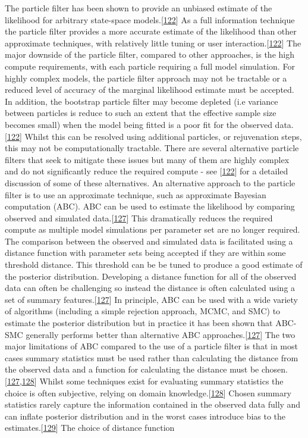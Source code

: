 \documentclass[11pt,twoside]{bristolthesis}
\begin{document}
  The particle filter has been shown to provide an unbiased estimate of the likelihood for arbitrary state-space models.{[}\protect\hyperlink{ref-Murray2015}{122}{]} As a full information technique the particle filter provides a more accurate estimate of the likelihood than other approximate techniques, with relatively little tuning or user interaction.{[}\protect\hyperlink{ref-Murray2015}{122}{]} The major downside of the particle filter, compared to other approaches, is the high compute requirements, with each particle requiring a full model simulation. For highly complex models, the particle filter approach may not be tractable or a reduced level of accuracy of the marginal likelihood estimate must be accepted. In addition, the bootstrap particle filter may become depleted (i.e variance between particles is reduce to such an extent that the effective sample size becomes small) when the model being fitted is a poor fit for the observed data.{[}\protect\hyperlink{ref-Murray2015}{122}{]} Whilst this can be resolved using additional particles, or rejuvenation steps, this may not be computationally tractable. There are several alternative particle filters that seek to mitigate these issues but many of them are highly complex and do not significantly reduce the required compute - see {[}\protect\hyperlink{ref-Murray2015}{122}{]} for a detailed discussion of some of these alternatives. An alternative approach to the particle filter is to use an approximate technique, such as approximate Bayesian computation (ABC). ABC can be used to estimate the likelihood by comparing observed and simulated data.{[}\protect\hyperlink{ref-Toni2009}{127}{]} This dramatically reduces the required compute as multiple model simulations per parameter set are no longer required. The comparison between the observed and simulated data is facilitated using a distance function with parameter sets being accepted if they are within some threshold distance. This threshold can be be tuned to produce a good estimate of the posterior distribution. Developing a distance function for all of the observed data can often be challenging so instead the distance is often calculated using a set of summary features.{[}\protect\hyperlink{ref-Toni2009}{127}{]} In principle, ABC can be used with a wide variety of algorithms (including a simple rejection approach, MCMC, and SMC) to estimate the posterior distribution but in practice it has been shown that ABC-SMC generally performs better than alternative ABC approaches.{[}\protect\hyperlink{ref-Toni2009}{127}{]} The two major limitations of ABC compared to the use of a particle filter is that in most cases summary statistics must be used rather than calculating the distance from the observed data and a function for calculating the distance must be chosen.{[}\protect\hyperlink{ref-Toni2009}{127},\protect\hyperlink{ref-Lintusaari2016}{128}{]} Whilst some techniques exist for evaluating summary statistics the choice is often subjective, relying on domain knowledge.{[}\protect\hyperlink{ref-Lintusaari2016}{128}{]} Chosen summary statistics rarely capture the information contained in the observed data fully and can inflate posterior distribution and in the worst cases introduce bias to the estimates.{[}\protect\hyperlink{ref-Busetto2013}{129}{]} The choice of distance function 
\end{document}
